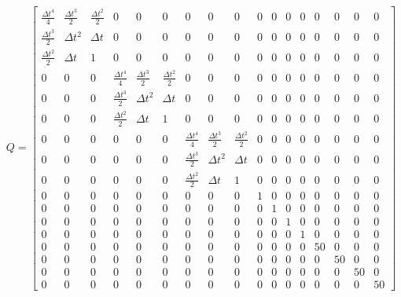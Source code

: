 \begin{equation*}
    Q = 
    \begin{bmatrix}
        \frac{\Delta t^{4}}{4} & \frac{\Delta t^{3}}{2} & \frac{\Delta t^{2}}{2} & 0 & 0 & 0 & 0 & 0 & 0 & 0 & 0 & 0 & 0 & 0 & 0 & 0 & 0 \\
        \frac{\Delta t^{3}}{2} & \Delta t^{2} & \Delta t & 0 & 0 & 0 & 0 & 0 & 0 & 0 & 0 & 0 & 0 & 0 & 0 & 0 & 0 \\
        \frac{\Delta t^{2}}{2} & \Delta t & 1 & 0 & 0 & 0 & 0 & 0 & 0 & 0 & 0 & 0 & 0 & 0 & 0 & 0 & 0 \\
        0 & 0 & 0 & \frac{\Delta t^{4}}{4} & \frac{\Delta t^{3}}{2} & \frac{\Delta t^{2}}{2} & 0 & 0 & 0 & 0 & 0 & 0 & 0 & 0 & 0 & 0 & 0 \\
        0 & 0 & 0 & \frac{\Delta t^{3}}{2} & \Delta t^{2} & \Delta t & 0 & 0 & 0 & 0 & 0 & 0 & 0 & 0 & 0 & 0 & 0 \\
        0 & 0 & 0 & \frac{\Delta t^{2}}{2} & \Delta t & 1 & 0 & 0 & 0 & 0 & 0 & 0 & 0 & 0 & 0 & 0 & 0 \\
        0 & 0 & 0 & 0 & 0 & 0 & \frac{\Delta t^{4}}{4} & \frac{\Delta t^{3}}{2} & \frac{\Delta t^{2}}{2} & 0 & 0 & 0 & 0 & 0 & 0 & 0 & 0 \\
        0 & 0 & 0 & 0 & 0 & 0 & \frac{\Delta t^{3}}{2} & \Delta t^{2} & \Delta t & 0 & 0 & 0 & 0 & 0 & 0 & 0 & 0 \\
        0 & 0 & 0 & 0 & 0 & 0 & \frac{\Delta t^{2}}{2} & \Delta t & 1 & 0 & 0 & 0 & 0 & 0 & 0 & 0 & 0 \\
        0 & 0 & 0 & 0 & 0 & 0 & 0 & 0 & 0 & 1 & 0 & 0 & 0 & 0 & 0 & 0 & 0 \\
        0 & 0 & 0 & 0 & 0 & 0 & 0 & 0 & 0 & 0 & 1 & 0 & 0 & 0 & 0 & 0 & 0 \\
        0 & 0 & 0 & 0 & 0 & 0 & 0 & 0 & 0 & 0 & 0 & 1 & 0 & 0 & 0 & 0 & 0 \\
        0 & 0 & 0 & 0 & 0 & 0 & 0 & 0 & 0 & 0 & 0 & 0 &  1 & 0 & 0 & 0 & 0 \\
        0 & 0 & 0 & 0 & 0 & 0 & 0 & 0 & 0 & 0 & 0 & 0 & 0 & 50 & 0 & 0 & 0 \\
        0 & 0 & 0 & 0 & 0 & 0 & 0 & 0 & 0 & 0 & 0 & 0 & 0 & 0 & 50 & 0 & 0 \\
        0 & 0 & 0 & 0 & 0 & 0 & 0 & 0 & 0 & 0 & 0 & 0 & 0 & 0 & 0 & 50 & 0 \\
        0 & 0 & 0 & 0 & 0 & 0 & 0 & 0 & 0 & 0 & 0 & 0 & 0 & 0 & 0 & 0 & 50
    \end{bmatrix}
\end{equation*}
